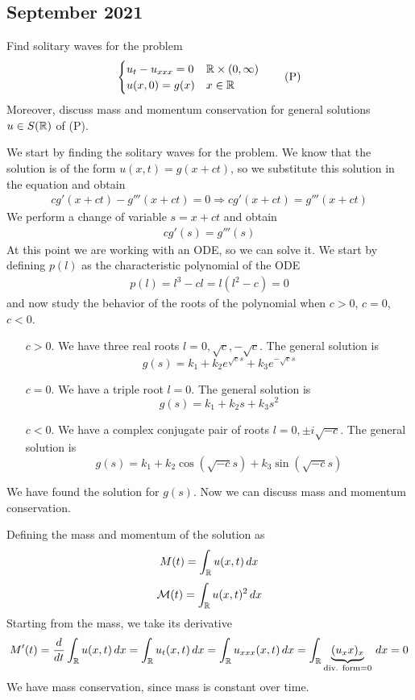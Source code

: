 \newpage
\subsection{September 2021}
\begin{exercise}
    Find solitary waves for the problem
    \[
        \begin{cases}
            u_t - u_{xxx} = 0 & \mathbb{R} \times (0, \infty) \\
            u(x, 0) = g(x) & x \in \mathbb{R}
        \end{cases}
        \tag*{(P)}
    \]
    Moreover, discuss mass and momentum conservation for general solutions \(u \in S(\mathbb{R})\) of (P).
\end{exercise}
We start by finding the solitary waves for the problem. We know that the solution is of the form \(u(x,t) = g(x + ct)\), so we substitute this solution in the equation and obtain
\[
    \begin{split}
        cg'(x+ct) - g'''(x+ct) = 0 \Rightarrow cg'(x+ct) = g'''(x+ct)
    \end{split}
\]
We perform a change of variable \(s = x + ct\) and obtain
\[
    \begin{split}
        cg'(s) = g'''(s)
    \end{split}
\]
At this point we are working with an ODE, so we can solve it. We start by defining \(p(l)\) as the characteristic polynomial of the ODE
\[
    \begin{split}
        p(l) = l^3 - c l = l(l^2 - c) = 0
    \end{split}
\]
and now study the behavior of the roots of the polynomial when \(c > 0\), \(c = 0\), \(c < 0\).
\begin{itemize}
    \item[\(c > 0\).] We have three real roots \(l = 0, \sqrt{c}, -\sqrt{c}\). The general solution is
    \[
        g(s) = k_1 + k_2 e^{\sqrt{c}s} + k_3 e^{-\sqrt{c}s}
    \]
    \item[\(c = 0\).] We have a triple root \(l = 0\). The general solution is
    \[
        g(s) = k_1 + k_2 s + k_3 s^2
    \]
    \item[\(c < 0\).] We have a complex conjugate pair of roots \(l = 0, \pm i \sqrt{-c}\). The general solution is
    \[
        g(s) = k_1 + k_2 \cos(\sqrt{-c}s) + k_3 \sin(\sqrt{-c}s)
    \]
\end{itemize}
We have found the solution for \(g(s)\). Now we can discuss mass and momentum conservation.

Defining the mass and momentum of the solution as
\[
    M(t) = \int_{\mathbb{R}} u(x,t) \, dx
\]
\[
    \mathcal{M}(t) = \int_{\mathbb{R}} u(x,t)^2 \, dx
\]
Starting from the mass, we take its derivative
\[
    \begin{split}
        M'(t) = \frac{d}{dt} \int_{\mathbb{R}} u(x,t) \, dx = \int_{\mathbb{R}} u_t(x,t) \, dx = \int_{\mathbb{R}} u_{xxx}(x,t) \, dx = \int_{\mathbb{R}} \underbrace{(u_xx)_x}_{\text{div. form} = 0} \, dx = 0
    \end{split}
\]
We have mass conservation, since mass is constant over time.

